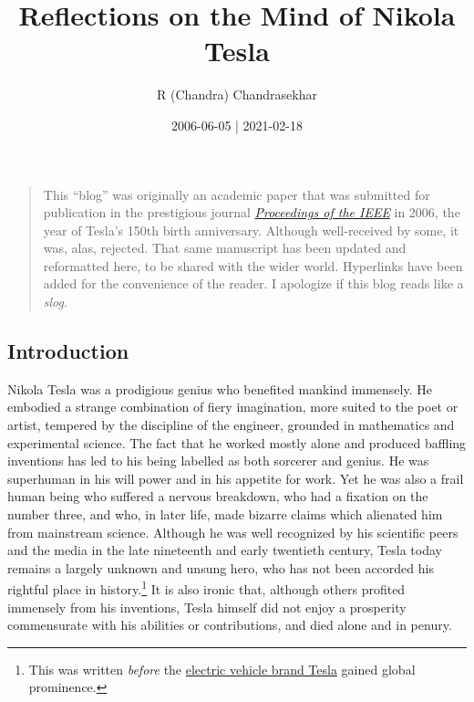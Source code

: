 \documentclass[
  11pt,
  a4paper,
]{article}
\title{Reflections on the Mind of Nikola Tesla}
\author{R (Chandra) Chandrasekhar}
\date{2006-06-05 | 2021-02-18}
\begin{document}
\maketitle

\thispagestyle{empty}


\begin{quote}
This ``blog'' was originally an academic paper that was submitted for
publication in the prestigious journal
\href{https://proceedingsoftheieee.ieee.org/}{\emph{Proceedings of the
IEEE}} in 2006, the year of Tesla's 150th birth anniversary. Although
well-received by some, it was, alas, rejected. That same manuscript has
been updated and reformatted here, to be shared with the wider world.
Hyperlinks have been added for the convenience of the reader. I
apologize if this blog reads like a \emph{slog}.
\normalfont
\end{quote}

\hypertarget{introduction}{%
\subsection{Introduction}\label{introduction}}

Nikola Tesla was a prodigious genius who benefited mankind immensely. He
embodied a strange combination of fiery imagination, more suited to the
poet or artist, tempered by the discipline of the engineer, grounded in
mathematics and experimental science. The fact that he worked mostly
alone and produced baffling inventions has led to his being labelled as
both sorcerer and genius. He was superhuman in his will power and in his
appetite for work. Yet he was also a frail human being who suffered a
nervous breakdown, who had a fixation on the number three, and who, in
later life, made bizarre claims which alienated him from mainstream
science. Although he was well recognized by his scientific peers and the
media in the late nineteenth and early twentieth century, Tesla today
remains a largely unknown and unsung hero, who has not been accorded his
rightful place in history.\footnote{This was written \emph{before} the
  \href{https://en.wikipedia.org/wiki/Tesla,_Inc.}{electric vehicle
  brand Tesla} gained global prominence.} It is also ironic that,
although others profited immensely from his inventions, Tesla himself
did not enjoy a prosperity commensurate with his abilities or
contributions, and died alone and in penury.
\end{document}
